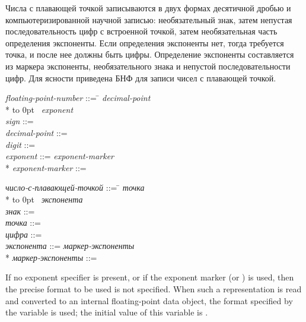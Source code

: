 Числа с плавающей точкой записываются в двух формах десятичной дробью и
компьютеризированной научной записью: необязательный знак, затем непустая
последовательность цифр с встроенной точкой, затем необязательная
часть определения экспоненты.
Если определения экспоненты нет, тогда требуется точка, и после нее должны быть
цифры.
Определение экспоненты составляется из маркера экспоненты, необязательного знака
и непустой последовательности цифр.
Для ясности приведена БНФ для записи чисел с плавающей точкой.
\begin{tabbing}
{\it floating-point-number} ::= \=  {\it
decimal-point}   \\*
\>\hbox to 0pt{\hss\Mor~}   {\it
exponent} \\
{\it sign} ::= \cd{+} {\Mor} \cd{-} \\
{\it decimal-point} ::=  \\
{\it digit} ::=  {\Mor}  {\Mor}  {\Mor}  {\Mor} 
         {\Mor}  {\Mor}  {\Mor}  {\Mor}  {\Mor} \\
{\it exponent} ::= {\it exponent-marker}  \\*
{\it exponent-marker} ::=  {\Mor}  {\Mor} 
{\Mor}  {\Mor}  {\Mor}  {\Mor}  {\Mor}  {\Mor}
 {\Mor} 
\end{tabbing}

\begin{tabbing}
{\it число-с-плавающей-точкой} ::= \=  {\it
точка}   \\*
\>\hbox to 0pt{\hss\Mor~}   {\it
экспонента} \\
{\it знак} ::= \cd{+} {\Mor} \cd{-} \\
{\it точка} ::=  \\
{\it цифра} ::=  {\Mor}  {\Mor}  {\Mor}  {\Mor} 
         {\Mor}  {\Mor}  {\Mor}  {\Mor}  {\Mor} \\
{\it экспонента} ::= {\it маркер-экспоненты}  \\*
{\it маркер-экспоненты} ::=  {\Mor}  {\Mor} 
{\Mor}  {\Mor}  {\Mor}  {\Mor}  {\Mor}  {\Mor}
 {\Mor} 
\end{tabbing}
If no exponent specifier is present, or if the exponent marker 
(or ) is used, then the precise format to be used is not
specified.  When such a representation is read and
converted to an internal floating-point data object, the format specified
by the variable  is used; the initial
value of this variable is .


